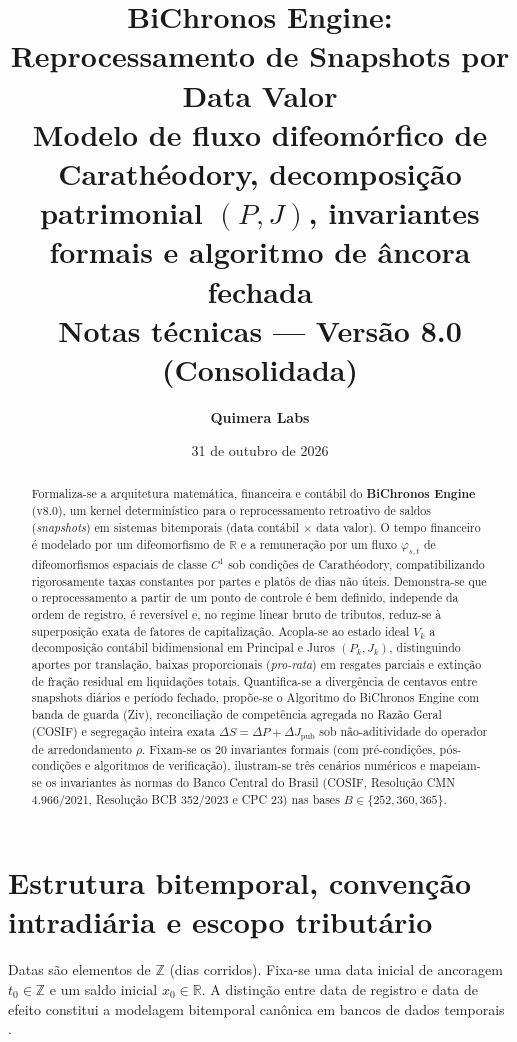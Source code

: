 \documentclass[11pt, a4paper]{article}
\title{\textbf{BiChronos Engine: Reprocessamento de Snapshots por Data Valor}\\[0.3em]\large Modelo de fluxo difeomórfico de Carathéodory, decomposição patrimonial $(P, J)$, invariantes formais e algoritmo de âncora fechada\\[0.2em]\normalsize Notas técnicas — Versão 8.0 (Consolidada)}
\author{\textbf{Quimera Labs}}
\date{31 de outubro de 2026}
\theoremstyle{definition}
\theoremstyle{plain}
\theoremstyle{remark}
\begin{document}
\maketitle

\begin{abstract}
\noindent Formaliza-se a arquitetura matemática, financeira e contábil do \textbf{BiChronos Engine} (v8.0), um kernel determinístico para o reprocessamento retroativo de saldos (\emph{snapshots}) em sistemas bitemporais (data contábil $\times$ data valor). O tempo financeiro é modelado por um difeomorfismo de $\mathbb{R}$ e a remuneração por um fluxo $\varphi_{s,t}$ de difeomorfismos espaciais de classe $C^1$ sob condições de Carathéodory, compatibilizando rigorosamente taxas constantes por partes e platôs de dias não úteis. Demonstra-se que o reprocessamento a partir de um ponto de controle é bem definido, independe da ordem de registro, é reversível e, no regime linear bruto de tributos, reduz-se à superposição exata de fatores de capitalização. Acopla-se ao estado ideal $V_k$ a decomposição contábil bidimensional em Principal e Juros $(P_k, J_k)$, distinguindo aportes por translação, baixas proporcionais (\emph{pro-rata}) em resgates parciais e extinção de fração residual em liquidações totais. Quantifica-se a divergência de centavos entre snapshots diários e período fechado, propõe-se o Algoritmo do BiChronos Engine com banda de guarda (Ziv), reconciliação de competência agregada no Razão Geral (COSIF) e segregação inteira exata $\Delta S = \Delta P + \Delta J_{\text{pub}}$ sob não-aditividade do operador de arredondamento $\rho$. Fixam-se os 20 invariantes formais (com pré-condições, pós-condições e algoritmos de verificação), ilustram-se três cenários numéricos e mapeiam-se os invariantes às normas do Banco Central do Brasil (COSIF, Resolução CMN 4.966/2021, Resolução BCB 352/2023 e CPC 23) nas bases $B \in \{252, 360, 365\}$.
\end{abstract}

\section{Estrutura bitemporal, convenção intradiária e escopo tributário}\label{sec:1}

Datas são elementos de $\mathbb{Z}$ (dias corridos). Fixa-se uma data inicial de ancoragem $t_0 \in \mathbb{Z}$ e um saldo inicial $x_0 \in \mathbb{R}$. A distinção entre data de registro e data de efeito constitui a modelagem bitemporal canônica em bancos de dados temporais \cite{Snodgrass1999, JensenSnodgrass1999, Date2014, Kulkarni2012, Fowler2021}.
\end{document}
